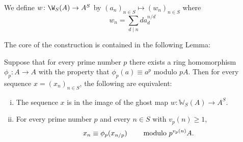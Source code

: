 \begin{definition}
    We define $w \colon \W_S(A) \to A^S$
    by $(a_n)_{n \in S} \mapsto (w_n)_{n \in S}$ where 
    \[
        w_n = \sum_{d \mid n} d a_d^{n/d}
    \]
\end{definition}
The core of the construction is contained in the following Lemma:
\begin{lemma}[Dwork]\label{lem: dwork}
    Suppose that for every prime number
$p$ there exists a ring homomorphism $\phi_p \colon A \to A$ with
the property that $\phi_p(a) \equiv a^p$ modulo $pA$. Then for every
sequence $x = (x_n)_{n \in S}$, the following 
are equivalent:
\begin{enumerate}[(i)]
\item The sequence $x$ is in the image of the ghost map
$w \colon \mathbb{W}_S(A) \to A^S.$
\item For every prime number $p$ and every $n \in S$
with $v_p(n) \geqslant 1$,
$$x_n \equiv \phi_p(x_{n/p}) \hskip8mm \text{modulo $p^{v_p(n)}A$.}$$
\end{enumerate}    
\end{lemma}
